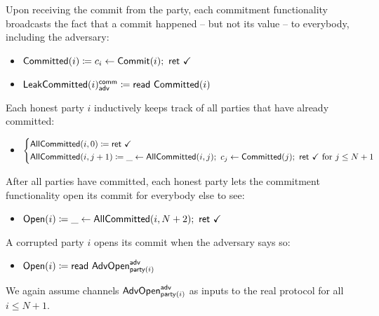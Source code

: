 Upon receiving the commit from the party, each commitment functionality broadcasts the fact that a commit happened -- but not its value -- to everybody, including the adversary:
\begin{itemize}
\item {\color{magenta} $\mathsf{Committed}(i) \coloneqq c_i \leftarrow \mathsf{Commit}(i); \ \mathsf{ret} \ \checkmark$}
\item {\color{magenta} $\mathsf{LeakCommitted}(i)^{\mathsf{comm}}_{\mathsf{adv}} \coloneqq \mathsf{read} \ \mathsf{Committed}(i)$}
\end{itemize}
Each honest party $i$ inductively keeps track of all parties that have already committed:
\begin{itemize}
\item {\color{magenta} $\begin{cases*} \AllCommitted(i,0) \coloneqq \ret{\checkmark} \\ \AllCommitted(i,j+1) \coloneqq \_ \leftarrow \AllCommitted(i,j); \ c_j \leftarrow \Committed(j); \ \ret{\checkmark} \text{ for $j \leq N+1$} \end{cases*}$}
\end{itemize}
After all parties have committed, each honest party lets the commitment functionality open its commit for everybody else to see:
\begin{itemize}
\item {\color{teal} $\Open(i) \coloneqq \_ \leftarrow \AllCommitted(i,N+2); \ \ret{\checkmark}$}
\end{itemize}
A corrupted party $i$ opens its commit when the adversary says so:
\begin{itemize}
\item {\color{teal} $\mathsf{Open}(i) \coloneqq \mathsf{read} \ \mathsf{AdvOpen}^{\mathsf{adv}}_{\mathsf{party}(i)}$}
\end{itemize}
We again assume channels $\mathsf{AdvOpen}^{\mathsf{adv}}_{\mathsf{party}(i)}$ as inputs to the real protocol for all $i \leq N+1$.

